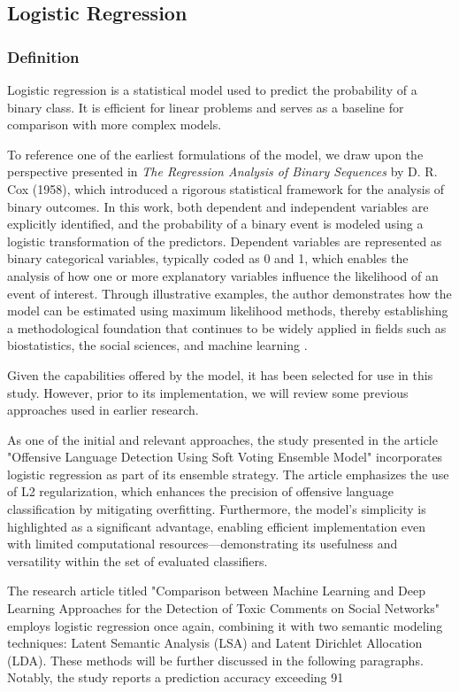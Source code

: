 \subsection{Logistic Regression}
\subsubsection{Definition}
Logistic regression is a statistical model used to predict the probability of a binary class. It is efficient for linear problems and serves as a baseline for comparison with more complex models.

To reference one of the earliest formulations of the model, we draw upon the perspective presented in \textit{The Regression Analysis of Binary Sequences} by D. R. Cox (1958), which introduced a rigorous statistical framework for the analysis of binary outcomes. In this work, both dependent and independent variables are explicitly identified, and the probability of a binary event is modeled using a logistic transformation of the predictors. Dependent variables are represented as binary categorical variables, typically coded as 0 and 1, which enables the analysis of how one or more explanatory variables influence the likelihood of an event of interest. Through illustrative examples, the author demonstrates how the model can be estimated using maximum likelihood methods, thereby establishing a methodological foundation that continues to be widely applied in fields such as biostatistics, the social sciences, and machine learning \citep{cox1958logistic}.

Given the capabilities offered by the model, it has been selected for use in this study. However, prior to its implementation, we will review some previous approaches used in earlier research.

As one of the initial and relevant approaches, the study presented in the article "Offensive Language Detection Using Soft Voting Ensemble Model" \citep{supert2023offensive} incorporates logistic regression as part of its ensemble strategy. The article emphasizes the use of L2 regularization, which enhances the precision of offensive language classification by mitigating overfitting. Furthermore, the model's simplicity is highlighted as a significant advantage, enabling efficient implementation even with limited computational resources—demonstrating its usefulness and versatility within the set of evaluated classifiers.

The research article titled "Comparison between Machine Learning and Deep Learning Approaches for the Detection of Toxic Comments on Social Networks" \citep{bonetti2023comparison} employs logistic regression once again, combining it with two semantic modeling techniques: Latent Semantic Analysis (LSA) and Latent Dirichlet Allocation (LDA). These methods will be further discussed in the following paragraphs. Notably, the study reports a prediction accuracy exceeding 91%
